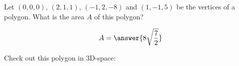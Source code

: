 \documentclass{ximera}
\author{Gregory Hartman \and Matthew Carr}
\begin{document}
\begin{exercise}

Let $(0,0,0)$, $(2,1,1)$, $(-1,2,-8)$  and $(1,-1,5)$ be the vertices of a polygon. What is the area $A$ of this polygon?
\begin{prompt}
\[
A=\answer{8\sqrt{\frac{7}{2}}}
\]
\end{prompt}
\begin{hint}
  Check out this polygon in $3$D-space:
  
  
\end{hint}

\end{exercise}
\end{document}
